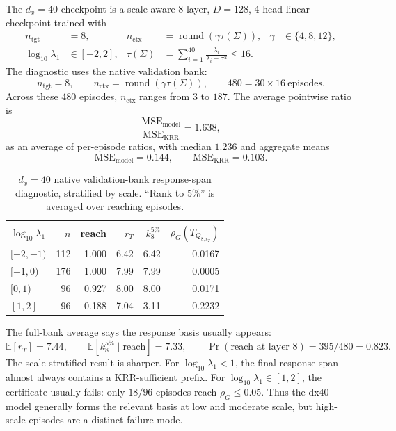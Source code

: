 \documentclass[11pt]{article}
\begin{document}
The \(d_x=40\) checkpoint  is a scale-aware 8-layer, \(D=128\), 4-head
linear checkpoint trained with
\[
\begin{aligned}
n_{\mathrm{tgt}}&=8,
&
n_{\mathrm{ctx}}&=\operatorname{round}(\gamma\tau(\Sigma)),
&
\gamma&\in\{4,8,12\},\\
\log_{10}\lambda_1&\in[-2,2],
&
\tau(\Sigma)&=\sum_{i=1}^{40}\frac{\lambda_i}{\lambda_i+\sigma^2}\le16.
\end{aligned}
\]
The diagnostic uses the native validation bank:
\[
n_{\mathrm{tgt}}=8,\qquad
n_{\mathrm{ctx}}=\operatorname{round}(\gamma\tau(\Sigma)),
\qquad
480=30\times16\ \text{episodes}.
\]
Across these 480 episodes, \(n_{\mathrm{ctx}}\) ranges from \(3\) to \(187\). The average
pointwise ratio is
\[
\frac{\mathrm{MSE}_{\mathrm{model}}}{\mathrm{MSE}_{\mathrm{KRR}}}=1.638,
\]
as an average of per-episode ratios, with median \(1.236\) and aggregate means
\[
\mathrm{MSE}_{\mathrm{model}}=0.144,
\qquad
\mathrm{MSE}_{\mathrm{KRR}}=0.103.
\]

\begin{table}[htbp]
\centering
\caption{\(d_x=40\) native validation-bank response-span diagnostic, stratified by scale.
``Rank to \(5\%\)'' is averaged over reaching episodes.}
\scriptsize
\setlength{\tabcolsep}{4pt}
\renewcommand{\arraystretch}{0.9}
\begin{tabular}{@{}lrrrrr@{}}
\toprule
\(\log_{10}\lambda_1\) & \(n\) & reach & \(r_T\) & \(k_8^{5\%}\) &
\(\rho_G(T_{Q_{8,r_T}})\)\\
\midrule
\([-2,-1)\) & 112 & 1.000 & 6.42 & 6.42 & 0.0167\\
\([-1,0)\)  & 176 & 1.000 & 7.99 & 7.99 & 0.0005\\
\([0,1)\)   & 96  & 0.927 & 8.00 & 8.00 & 0.0171\\
\([1,2]\)   & 96  & 0.188 & 7.04 & 3.11 & 0.2232\\
\bottomrule
\end{tabular}
\renewcommand{\arraystretch}{1}
\end{table}

The full-bank average says the response basis usually appears:
\[
\mathbb{E}[r_T]=7.44,
\qquad
\mathbb{E}[k_8^{5\%}\mid \text{reach}]=7.33,
\qquad
\Pr(\text{reach at layer }8)=395/480=0.823.
\]
The scale-stratified result is sharper. For
\(\log_{10}\lambda_1<1\), the final response span almost always contains a KRR-sufficient prefix.
For \(\log_{10}\lambda_1\in[1,2]\), the certificate usually fails: only \(18/96\) episodes reach
\(\rho_G\le0.05\). Thus the dx40 model generally forms the relevant basis at low and moderate
scale, but high-scale episodes are a distinct failure mode.
\end{document}
